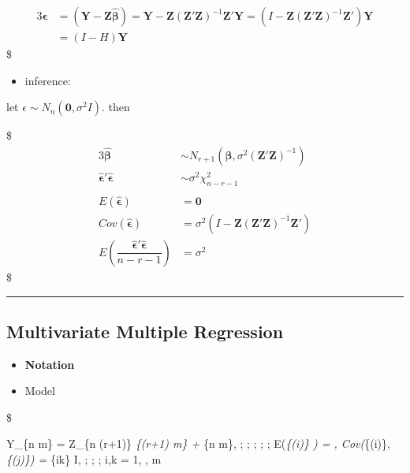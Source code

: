 \documentclass[
]{book}
\providecommand{\tightlist}{%
  \setlength{\itemsep}{0pt}\setlength{\parskip}{0pt}}
\begin{document}
{{\begin{alignat*}{3}
\hat {\pmb \epsilon} &= (\pmb Y - \pmb Z \hat {\pmb \beta}) = \pmb Y - \pmb Z (\pmb Z ' \pmb Z )^{-1} \pmb Z ' \pmb Y = (I - \pmb Z (\pmb Z ' \pmb Z )^{-1} \pmb Z ') \pmb Y \\ &= (I-H)\pmb Y

\end{alignat*}
\$

\begin{itemize}
\tightlist
\item
  inference:
\end{itemize}

let \(\epsilon \sim N_n (\pmb 0, \sigma^2 I)\). then

\$
\begin{alignat*}{3}

\hat {\pmb \beta} &\sim  N_{r+1} (\pmb \beta , \sigma^2(\pmb Z '\pmb Z )^{-1}) \\

\hat {\pmb \epsilon} ' \hat {\pmb \epsilon} &\sim \sigma^2 \chi^2_{n-r-1} \\

\\  

E(\hat {\pmb \epsilon} ) &= \pmb 0 \\

Cov(\hat {\pmb \epsilon} ) &= \sigma^2 (I - \pmb Z (\pmb Z ' \pmb Z )^{-1} \pmb Z ') \\

E\left( \dfrac{\hat {\pmb \epsilon} ' \hat {\pmb \epsilon}}{n-r-1} \right) &= \sigma^2

\end{alignat*}
\$

\begin{center}\rule{0.5\linewidth}{0.5pt}\end{center}

\hypertarget{multivariate-multiple-regression}{%
\subsection{Multivariate Multiple Regression}\label{multivariate-multiple-regression}}

\begin{itemize}
\item
  \textbf{Notation}
\item
  Model
\end{itemize}

\$

\pmb Y\_\{n \times m\} = \pmb Z\_\{n \times (r+1)\} \pmb \beta\emph{\{(r+1) \times m\} + \pmb \epsilon}\{n \times m\}, ; ; ; ; ; E(\pmb \epsilon\emph{\{(i)\} ) = , Cov(\pmb \epsilon}\{(i)\}, \pmb \epsilon\emph{\{(j)\}) = \sigma}\{ik\} I, ; ; ; i,k = 1, \cdots, m

}}
\end{document}

